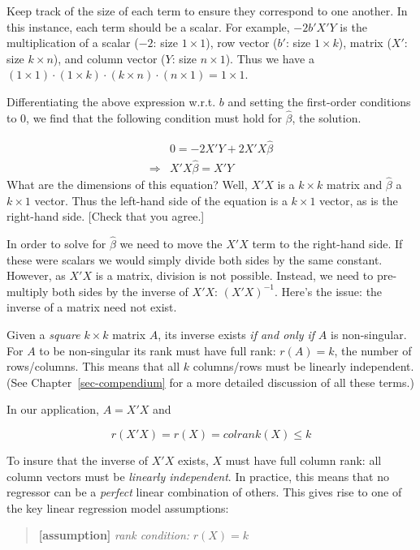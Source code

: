 \documentclass[
  letterpaper,
  DIV=11,
  numbers=noendperiod]{scrreprt}
\begin{document}
Keep track of the size of each term to ensure they correspond to one
another. In this instance, each term should be a scalar. For example,
\(-2b'X'Y\) is the multiplication of a scalar (\(-2\): size
\(1\times 1\)), row vector (\(b'\): size \(1\times k\)), matrix (\(X'\):
size \(k\times n\)), and column vector (\(Y\): size \(n\times 1\)). Thus
we have a
\((1\times 1)\cdot (1\times k)\cdot (k\times n)\cdot (n\times 1)=1\times 1\).

Differentiating the above expression w.r.t. \(b\) and setting the
first-order conditions to \(0\), we find that the following condition
must hold for \(\hat{\beta}\), the solution.

\[ \begin{align} &0=-2X'Y+2X'X\hat{\beta} \\ \Rightarrow& X'X\hat{\beta} = X'Y \end{align} \]
What are the dimensions of this equation? Well, \(X'X\) is a
\(k\times k\) matrix and \(\hat{\beta}\) a \(k\times 1\) vector. Thus
the left-hand side of the equation is a \(k\times 1\) vector, as is the
right-hand side. {[}Check that you agree.{]}

In order to solve for \(\hat{\beta}\) we need to move the \(X'X\) term
to the right-hand side. If these were scalars we would simply divide
both sides by the same constant. However, as \(X'X\) is a matrix,
division is not possible. Instead, we need to pre-multiply both sides by
the inverse of \(X'X\): \((X'X)^{-1}\). Here's the issue: the inverse of
a matrix need not exist.

Given a \emph{square} \(k\times k\) matrix \(A\), its inverse exists
\emph{if and only if} \(A\) is non-singular. For \(A\) to be
non-singular its rank must have full rank: \(r(A)=k\), the number of
rows/columns. This means that all \(k\) columns/rows must be linearly
independent. (See Chapter~\ref{sec-compendium} for a more detailed
discussion of all these terms.)

In our application, \(A=X'X\) and

\[ r(X'X) = r(X) = colrank(X)\leq k \]

To insure that the inverse of \(X'X\) exists, \(X\) must have full
column rank: all column vectors must be \emph{linearly independent}. In
practice, this means that no regressor can be a \emph{perfect} linear
combination of others. This gives rise to one of the key linear
regression model assumptions:

\begin{quote}
\textbf{{[}assumption{]}} \emph{rank condition:} \(r(X)=k\)
\end{quote}
\end{document}
